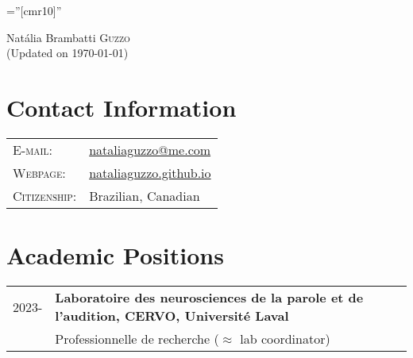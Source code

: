 \documentclass[letterpaper,10pt]{article}
\begin{document}
\thispagestyle{empty}



\font\fb=''[cmr10]'' %

\par{\centering
		{\Huge Nat\'alia Brambatti G\textsc{uzzo}} \\ (Updated on \today)
	\bigskip\par}

\section{Contact Information}

\begin{tabular}{p{4cm}l}
    \textsc{E-mail:}     & \href{mailto:nataliaguzzo@me.com}{nataliaguzzo@me.com} \\ %
     \textsc{Webpage:}     & \href{https://nataliaguzzo.github.io}{nataliaguzzo.github.io}\\
   \textsc{Citizenship:}   & Brazilian, Canadian\\
\end{tabular}




\vspace{0.3cm}

\section{Academic Positions}

\begin{tabular}{p{1.6cm}p{15.4cm}}
2023-  & \textbf{Laboratoire des neurosciences de la parole et de l'audition, CERVO, Universit\'e Laval}\\
& Professionnelle de recherche ($\approx$ lab coordinator)
\end{tabular}
\end{document}
